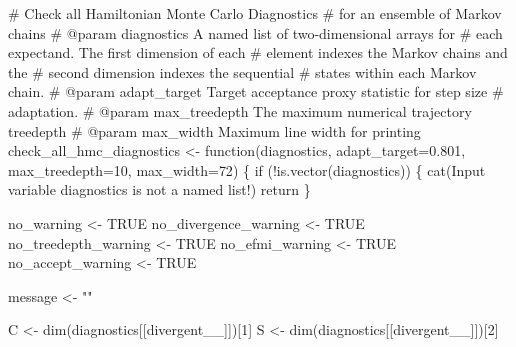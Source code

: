 \documentclass[
  letterpaper,
  DIV=11,
  numbers=noendperiod]{scrartcl}
\newenvironment{Shaded}{\begin{snugshade}}{\end{snugshade}}
\newcommand{\AttributeTok}[1]{\textcolor[rgb]{0.40,0.45,0.13}{#1}}
\newcommand{\CommentTok}[1]{\textcolor[rgb]{0.37,0.37,0.37}{#1}}
\newcommand{\ConstantTok}[1]{\textcolor[rgb]{0.56,0.35,0.01}{#1}}
\newcommand{\ControlFlowTok}[1]{\textcolor[rgb]{0.00,0.23,0.31}{#1}}
\newcommand{\DecValTok}[1]{\textcolor[rgb]{0.68,0.00,0.00}{#1}}
\newcommand{\FloatTok}[1]{\textcolor[rgb]{0.68,0.00,0.00}{#1}}
\newcommand{\FunctionTok}[1]{\textcolor[rgb]{0.28,0.35,0.67}{#1}}
\newcommand{\NormalTok}[1]{\textcolor[rgb]{0.00,0.23,0.31}{#1}}
\newcommand{\OtherTok}[1]{\textcolor[rgb]{0.00,0.23,0.31}{#1}}
\newcommand{\SpecialCharTok}[1]{\textcolor[rgb]{0.37,0.37,0.37}{#1}}
\newcommand{\StringTok}[1]{\textcolor[rgb]{0.13,0.47,0.30}{#1}}
\begin{document}
\begin{Shaded}
\begin{Highlighting}[]
\CommentTok{\# Check all Hamiltonian Monte Carlo Diagnostics }
\CommentTok{\# for an ensemble of Markov chains}
\CommentTok{\# @param diagnostics A named list of two{-}dimensional arrays for }
\CommentTok{\#                    each expectand.  The first dimension of each}
\CommentTok{\#                    element indexes the Markov chains and the }
\CommentTok{\#                    second dimension indexes the sequential }
\CommentTok{\#                    states within each Markov chain.}
\CommentTok{\# @param adapt\_target Target acceptance proxy statistic for step size }
\CommentTok{\#                     adaptation.}
\CommentTok{\# @param max\_treedepth The maximum numerical trajectory treedepth}
\CommentTok{\# @param max\_width Maximum line width for printing}
\NormalTok{check\_all\_hmc\_diagnostics }\OtherTok{\textless{}{-}} \ControlFlowTok{function}\NormalTok{(diagnostics,}
                                      \AttributeTok{adapt\_target=}\FloatTok{0.801}\NormalTok{,}
                                      \AttributeTok{max\_treedepth=}\DecValTok{10}\NormalTok{,}
                                      \AttributeTok{max\_width=}\DecValTok{72}\NormalTok{) \{}
  \ControlFlowTok{if}\NormalTok{ (}\SpecialCharTok{!}\FunctionTok{is.vector}\NormalTok{(diagnostics)) \{}
    \FunctionTok{cat}\NormalTok{(}\StringTok{\textquotesingle{}Input variable \textasciigrave{}diagnostics\textasciigrave{} is not a named list!\textquotesingle{}}\NormalTok{)}
\NormalTok{    return}
\NormalTok{  \}}
  
\NormalTok{  no\_warning }\OtherTok{\textless{}{-}} \ConstantTok{TRUE}
\NormalTok{  no\_divergence\_warning }\OtherTok{\textless{}{-}} \ConstantTok{TRUE}
\NormalTok{  no\_treedepth\_warning }\OtherTok{\textless{}{-}} \ConstantTok{TRUE}
\NormalTok{  no\_efmi\_warning }\OtherTok{\textless{}{-}} \ConstantTok{TRUE}
\NormalTok{  no\_accept\_warning }\OtherTok{\textless{}{-}} \ConstantTok{TRUE}
  
\NormalTok{  message }\OtherTok{\textless{}{-}} \StringTok{""}
  
\NormalTok{  C }\OtherTok{\textless{}{-}} \FunctionTok{dim}\NormalTok{(diagnostics[[}\StringTok{\textquotesingle{}divergent\_\_\textquotesingle{}}\NormalTok{]])[}\DecValTok{1}\NormalTok{]}
\NormalTok{  S }\OtherTok{\textless{}{-}} \FunctionTok{dim}\NormalTok{(diagnostics[[}\StringTok{\textquotesingle{}divergent\_\_\textquotesingle{}}\NormalTok{]])[}\DecValTok{2}\NormalTok{]}
  

\end{Highlighting}
\end{Shaded}
\end{document}
